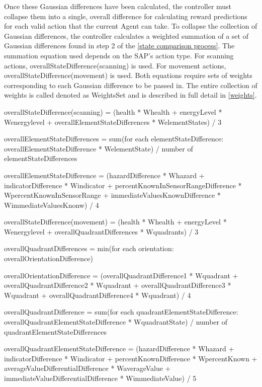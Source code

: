 Once these Gaussian differences have been calculated, the controller must collapse them into a single, overall difference for calculating reward predictions for each valid action that the current Agent can take.
To collapse the collection of Gaussian differences, the controller calculates a weighted summation of a set of Gaussian differences found in step 2 of the \ref{state comparison process}.
The summation equation used depends on the SAP's action type.
For scanning actions, overallStateDifference(scanning) is used.
For movement actions, overallStateDifference(movement) is used.
Both equations require sets of weights corresponding to each Gaussian difference to be passed in.
The entire collection of weights is called denoted as WeightsSet and is described in full detail in \ref{weights}.

\begin{listings}
overallStateDifference(scanning) = (health * Whealth + energyLevel * Wenergylevel + overallElementStateDifferences * WelementStates) / 3

overallElementStateDifferences = sum(for each elementStateDifference: overallElementStateDifference * WelementState) / number of elementStateDifferences

overallElementStateDifference = (hazardDifference * Whazard + indicatorDifference * Windicator + percentKnownInSensorRangeDifference * WpercentKnownInSensorRange + immediateValuesKnownDifference * WimmediateValuesKnonw) / 4

overallStateDifference(movement) = (health * Whealth + energyLevel * Wenergylevel + overallQuadrantDifferences * Wquadrants) / 3

overallQuadrantDifferences = min(for each orientation: overallOrientationDifference)

overallOrientationDifference = (overallQuadrantDifference1 * Wquadrant + overallQuadrantDifference2 * Wquadrant + overallQuadrantDifference3 * Wquadrant + overallQuadrantDifference4 * Wquadrant) / 4

overallQuadrantDifference = sum(for each quadrantElementStateDifference: overallQuadrantElementStateDifference * WquadrantState) / number of quadrantElementStateDifferences

overallQuadrantElementStateDifference = (hazardDifference * Whazard + indicatorDifference * Windicator + percentKnownDifference * WpercentKnown + averageValueDifferentialDifference * WaverageValue + immediateValueDifferentialDifference * WimmediateValue) / 5
\end{listings}


